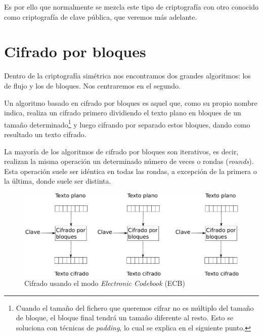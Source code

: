 Es por ello que normalmente se mezcla este tipo de criptografía con otro conocido como criptografía de clave pública, que veremos más adelante.


\section{Cifrado por bloques}

Dentro de la criptografía simétrica nos encontramos dos grandes algoritmos: los de flujo y los de bloques. Nos centraremos en el segundo.

Un algoritmo basado en cifrado por bloques es aquel que, como su propio nombre indica, realiza un cifrado primero dividiendo el texto plano en bloques de un tamaño determinado\footnote{Cuando el tamaño del fichero que queremos cifrar no es múltiplo del tamaño de bloque, el bloque final tendrá un tamaño diferente al resto. Esto se soluciona con técnicas de \emph{padding}, lo cual se explica en el siguiente punto.} y luego cifrando por separado estos bloques, dando como resultado un texto cifrado.

La mayoría de los algoritmos de cifrado por bloques son iterativos, es decir, realizan la misma operación un determinado número de veces o rondas (\emph{rounds}). Esta operación suele ser idéntica en todas las rondas, a excepción de la primera o la última, donde suele ser distinta.

\begin{figure}[ht]
  \centering
  \includegraphics[scale=0.5]{Figures/ECB}
  \decoRule
  \caption[\emph{Electronic Codebook} (ECB)]{Cifrado usando el modo \emph{Electronic Codebook} (ECB)}
  \label{fig:ECB}
\end{figure}

